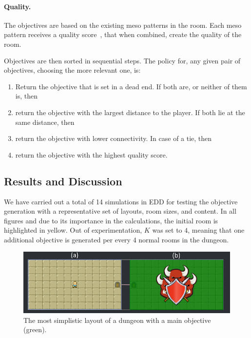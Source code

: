 \paragraph*{Quality.} The objectives are based on the existing meso patterns in the room. Each meso pattern receives a quality score~, that when combined, create the quality of the room.


Objectives are then sorted in sequential steps. The policy for, any given pair of objectives, choosing the more relevant one, is:

\begin{enumerate}
    \item Return the objective that is set in a dead end. If both are, or neither of them is, then
    \item return the objective with the largest distance to the player. If both lie at the same distance, then
    \item return the objective with lower connectivity. In case of a tie, then
    \item return the objective with the highest quality score.
\end{enumerate}


\subsection{Results and Discussion}

We have carried out a total of 14 simulations in EDD for testing the objective generation with a representative set of layouts, room sizes, and content. In all figures and due to its importance in the calculations, the initial room is highlighted in yellow. Out of experimentation, $K$ was set to $4$, meaning that one additional objective is generated per every 4 normal rooms in the dungeon.

\begin{figure}[h]
  \centering
  \includegraphics[width=\columnwidth]{included-papers-tex/paper-7/figures/results1.png}
  \caption{The most simplistic layout of a dungeon with a main objective (green).}
  \label{fig:oldfig5}
\end{figure}


